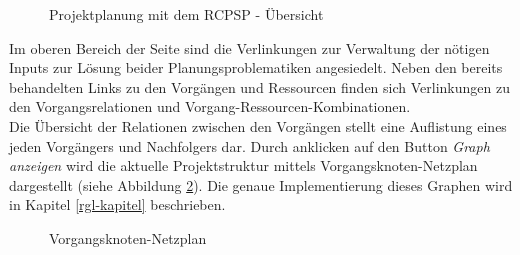 \documentclass[a4paper,12pt,parskip,bibtotoc,liststotoc]{article}
\begin{document}
\begin{figure}[h!]
  \begin{center}
    \caption{Projektplanung mit dem RCPSP - Übersicht}  \label{RCPSP}
  \end{center}
\end{figure}

Im oberen Bereich der Seite sind die Verlinkungen zur Verwaltung der nötigen Inputs zur Lösung beider Planungsproblematiken angesiedelt. Neben den bereits behandelten Links zu den Vorgängen und Ressourcen finden sich Verlinkungen zu den Vorgangsrelationen und Vorgang-Ressourcen-Kombinationen.\\ 

Die Übersicht der Relationen zwischen den Vorgängen stellt eine Auflistung eines jeden Vorgängers und Nachfolgers dar. Durch anklicken auf den Button \textit{Graph anzeigen} wird die aktuelle Projektstruktur mittels Vorgangsknoten-Netzplan dargestellt (siehe Abbildung \ref{Graphp}). Die genaue Implementierung dieses Graphen wird in Kapitel \ref{rgl-kapitel} beschrieben.
\begin{figure}[h!]
  \begin{center}
    \caption{Vorgangsknoten-Netzplan}  \label{Graphp}
  \end{center}
\end{figure}
\end{document}
